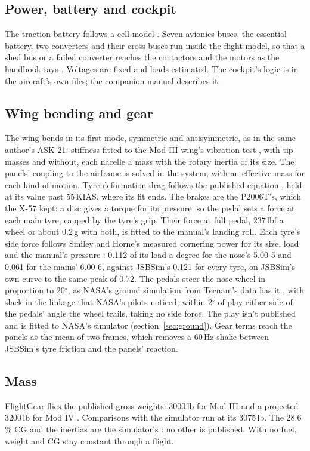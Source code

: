 \documentclass[10pt,a4paper,twocolumn]{article}
\begin{document}
\subsection{Power, battery and cockpit}
The traction battery follows a cell model \cite{chin}. Seven avionics buses, the essential battery, two converters and their cross buses run inside the flight model, so that a shed bus or a failed converter
reaches the contactors and the motors as the handbook says \cite{icd}. Voltages are fixed and loads estimated. The cockpit's logic is in the aircraft's own files; the companion manual describes it.

\subsection{Wing bending and gear}
The wing bends in its first mode, symmetric and antisymmetric, as in the same author's ASK 21: stiffness fitted to the Mod III wing's vibration test \cite{gvt}, with tip masses and without, each nacelle a mass with the rotary inertia of its size. The panels' coupling to the airframe is solved in the system, with an effective
mass for each kind of motion. Tyre deformation drag follows the published equation \cite{gd}, held at its value past 55\,KIAS, where its fit ends. The brakes are the P2006T's, which the X-57 kept: a disc gives a torque for its pressure, so the pedal sets a force at each main tyre, capped by the tyre's grip. Their force at full pedal, 237\,lbf a wheel or about 0.2\,g with both, is fitted to the manual's landing roll. Each tyre's side force follows Smiley and Horne's measured cornering power for its size, load and the manual's pressure \cite{sh,gy,afm}: 0.112 of its load a degree for the nose's 5.00-5 and 0.061 for the mains' 6.00-6, against JSBSim's 0.121 for every tyre, on JSBSim's own curve to the same peak of 0.72. The pedals steer the nose wheel in proportion to 20$^\circ$, as NASA's ground simulation from Tecnam's data has it \cite{gd}, with slack in the linkage that NASA's pilots noticed; within 2$^\circ$ of play either side of the pedals' angle the wheel trails, taking no side force. The play isn't published and is fitted to NASA's simulator (section~\ref{sec:ground}). Gear terms reach the panels as the mean of two frames, which removes a 60\,Hz shake
between JSBSim's tyre friction and the panels' reaction.

\subsection{Mass}
FlightGear flies the published gross weights: 3000\,lb for Mod III \cite{tm} and a projected 3200\,lb for Mod IV \cite{fl}. Comparisons with the simulator run at its 3075\,lb. The 28.6\,\% CG and the inertias are the simulator's \cite{sim3}: no other is published.
With no fuel, weight and CG stay constant through a flight.
\end{document}
